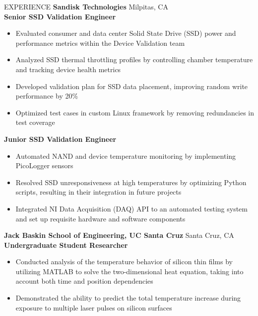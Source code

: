 \documentclass{resume} %
\begin{document}
\begin{rSection}{EXPERIENCE}
\textbf{Sandisk Technologies}  \hfill Milpitas, CA\\
\hspace*{4mm}\textbf{Senior SSD Validation Engineer}  \hfill {}
 \begin{itemize}[left=2em]
 \itemsep -0.5em \vspace{-0.5em}
     \item Evaluated consumer and data center Solid State Drive (SSD) power and performance metrics within the Device Validation team
     \item Analyzed SSD thermal throttling profiles by controlling chamber temperature and tracking device health metrics
   \item Developed validation plan for SSD data placement, improving random write performance by 20\%
     \item Optimized test cases in custom Linux framework by removing redundancies in test coverage

 \end{itemize}

\hspace*{4mm}\textbf{Junior SSD Validation Engineer}  \hfill {}
 \begin{itemize}[left=2em]
 \itemsep -0.5em \vspace{-0.5em}
    \item Automated NAND and device temperature monitoring by implementing PicoLogger sensors
     \item Resolved SSD unresponsiveness at high temperatures by optimizing Python scripts, resulting in their integration in future projects
    \item Integrated NI Data Acquisition (DAQ) API to an automated testing system and set up requisite hardware and software components
 \end{itemize}

\textbf{Jack Baskin School of Engineering, UC Santa Cruz} \hfill Santa Cruz, CA \\
\hspace*{4mm}\textbf{Undergraduate Student Researcher} \hfill {}
 \begin{itemize}[left=2em]
 \itemsep -0.5em \vspace{-0.5em}
    \item Conducted analysis of the temperature behavior of silicon thin films by utilizing MATLAB to solve the two-dimensional heat equation, taking into account both time and position dependencies
    \item Demonstrated the ability to predict the total temperature increase during exposure to multiple laser pulses on silicon surfaces
 \end{itemize}


\end{rSection} 
\end{document}
